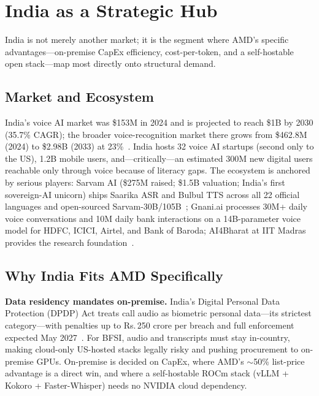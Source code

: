 \documentclass[blind]{gtac}
\providecommand{\rupee}{\ensuremath{\text{\rm\textsf{R}}}} %
\renewcommand{\rupee}{Rs.\,} %
\begin{document}
\section{India as a Strategic Hub}
\label{sec:india}

India is not merely another market; it is the segment where AMD's specific advantages---on-premise CapEx efficiency, cost-per-token, and a self-hostable open stack---map most directly onto structural demand.

\subsection{Market and Ecosystem}

India's voice AI market was \$153M in 2024 and is projected to reach \$1B by 2030 (35.7\% CAGR); the broader voice-recognition market there grows from \$462.8M (2024) to \$2.98B (2033) at 23\%~\cite{india_guide}. India hosts 32 voice AI startups (second only to the US), 1.2B mobile users, and---critically---an estimated 300M new digital users reachable only through voice because of literacy gaps. The ecosystem is anchored by serious players: Sarvam AI (\$275M raised; \$1.5B valuation; India's first sovereign-AI unicorn) ships Saarika ASR and Bulbul TTS across all 22 official languages and open-sourced Sarvam-30B/105B~\cite{slator_sarvam}; Gnani.ai processes 30M+ daily voice conversations and 10M daily bank interactions on a 14B-parameter voice model for HDFC, ICICI, Airtel, and Bank of Baroda; AI4Bharat at IIT Madras provides the research foundation~\cite{sarvam_asr,indic_asr}.

\subsection{Why India Fits AMD Specifically}

\textbf{Data residency mandates on-premise.} India's Digital Personal Data Protection (DPDP) Act treats call audio as biometric personal data---its strictest category---with penalties up to \rupee 250 crore per breach and full enforcement expected May 2027~\cite{dpdp_checklist}. For BFSI, audio and transcripts must stay in-country, making cloud-only US-hosted stacks legally risky and pushing procurement to on-premise GPUs. On-premise is decided on CapEx, where AMD's $\sim$50\% list-price advantage is a direct win, and where a self-hostable ROCm stack (vLLM + Kokoro + Faster-Whisper) needs no NVIDIA cloud dependency.
\end{document}
